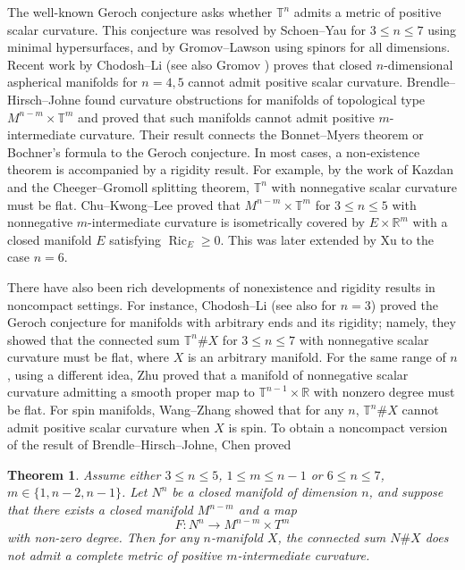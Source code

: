 \documentclass[11pt,letterpaper]{amsart}
\newtheorem{theorem}{Theorem}[section]
\theoremstyle{definition}
\theoremstyle{remark}
\numberwithin{equation}{section}
\begin{document}
The well-known Geroch conjecture asks whether $\mathbb{T}^n$ admits a metric of positive scalar curvature. This conjecture was resolved by Schoen--Yau \cite{Schoen-Yau-PSC} for $3 \leq n \leq 7$ using minimal hypersurfaces, and by Gromov--Lawson \cite{Gromov-Lawson-ann} using spinors for all dimensions. Recent work by Chodosh--Li \cite{chodoshlisoapbubble} (see also Gromov \cite{gromov-apherical-conjecture}) proves that closed $n$-dimensional aspherical manifolds for $n = 4,5$ cannot admit positive scalar curvature. Brendle--Hirsch--Johne \cite{brendlegeroch'sconjecture} found curvature obstructions for manifolds of topological type $M^{n-m}\times \mathbb{T}^m$ and proved that such manifolds cannot admit positive $m$-intermediate curvature. Their result connects the Bonnet--Myers theorem or Bochner's formula to the Geroch conjecture. In most cases, a non-existence theorem is accompanied by a rigidity result. For example, by the work of Kazdan \cite{kazdan-deformation} and the Cheeger--Gromoll splitting theorem, $\mathbb{T}^n$ with nonnegative scalar curvature must be flat. Chu--Kwong--Lee \cite{ChuKwongLeerigidity} proved that $M^{n-m}\times \mathbb{T}^m$ for $3 \leq n \leq 5$ with nonnegative $m$-intermediate curvature is isometrically covered by $E \times \mathbb{R}^m$ with a closed manifold $E$ satisfying $\operatorname{Ric}_E \geq 0$. This was later extended by Xu \cite{XuTrans} to the case $n = 6$.

There have also been rich developments of nonexistence and rigidity results in noncompact settings. For instance, Chodosh--Li \cite{chodoshlisoapbubble} (see also \cite{lesourd-unger-yau} for $n=3$) proved the Geroch conjecture for manifolds with arbitrary ends and its rigidity; namely, they showed that the connected sum $\mathbb{T}^n\# X$ for $3\leq n\leq 7$ with nonnegative scalar curvature must be flat, where $X$ is an arbitrary manifold. For the same range of $n$, using a different idea, Zhu \cite{zhu-splitting} proved that a manifold of nonnegative scalar curvature admitting a smooth proper map to $\mathbb{T}^{n-1}\times \mathbb{R}$ with nonzero degree must be flat. For spin manifolds, Wang--Zhang \cite{Wang-Zhang-geroch} showed that for any $n$, $\mathbb{T}^n\# X$ cannot admit positive scalar curvature when $X$ is spin. To obtain a noncompact version of the result of Brendle--Hirsch--Johne, Chen \cite{chenshuli_end} proved
\begin{theorem}\cite{chenshuli_end}\label{chenshuli theorem}
Assume either $3 \le n \le 5$, $1 \le m \le n-1$ or $6 \le n \le 7$, $m \in \{1, n-2, n-1\}$. 
Let $N^n$ be a closed manifold of dimension $n$, and suppose that there exists a closed manifold $M^{n-m}$ and a map 
\[
F : N^n \to M^{n-m} \times T^m
\]
with non-zero degree. Then for any $n$-manifold $X$, the connected sum $N \# X$ does not admit a complete metric of positive $m$-intermediate curvature.
\end{theorem}
\end{document}

